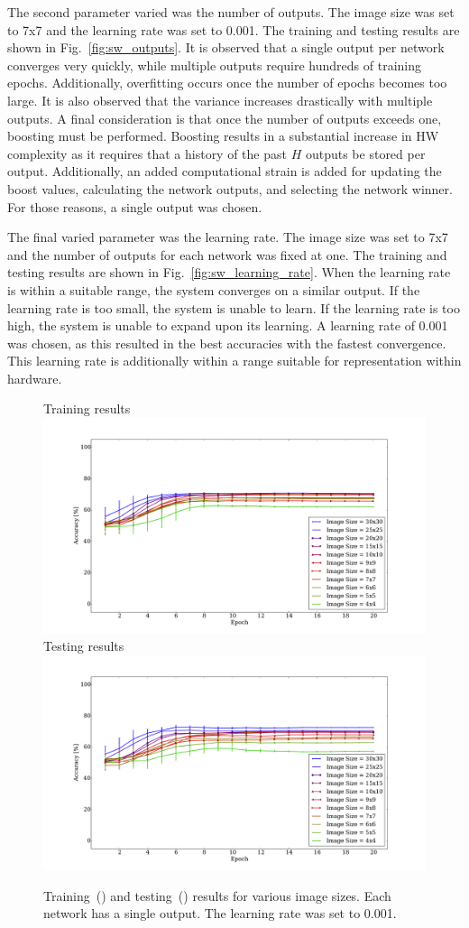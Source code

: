 \documentclass[10pt,journal]{IEEEtran}
\newcommand{\fig}[1]{Fig.~\ref{#1}}
\begin{document}
				The second parameter varied was the number of outputs. The image size was set to 7x7 and the learning rate was set to 0.001. The training and testing results are shown in \fig{fig:sw_outputs}. It is observed that a single output per network converges very quickly, while multiple outputs require hundreds of training epochs. Additionally, overfitting occurs once the number of epochs becomes too large. It is also observed that the variance increases drastically with multiple outputs. A final consideration is that once the number of outputs exceeds one, boosting must be performed. Boosting results in a substantial increase in HW complexity as it requires that a history of the past \(H\) outputs be stored per output. Additionally, an added computational strain is added for updating the boost values, calculating the network outputs, and selecting the network winner. For those reasons, a single output was chosen.
				
				The final varied parameter was the learning rate. The image size was set to 7x7 and the number of outputs for each network was fixed at one. The training and testing results are shown in \fig{fig:sw_learning_rate}. When the learning rate is within a suitable range, the system converges on a similar output. If the learning rate is too small, the system is unable to learn. If the learning rate is too high, the system is unable to expand upon its learning. A learning rate of 0.001 was chosen, as this resulted in the best accuracies with the fastest convergence. This learning rate is additionally within a range suitable for representation within hardware.
				
				\begin{figure}[t!]
					\captionsetup[subfigure]{position=b}
					\centering
					\hfill
					\subcaptionbox
					{
						Training results
						\label{fig:sw_img:training}
					}
					{\includegraphics[width=0.49\linewidth]{sw_img_training}}
					\hfill
					\subcaptionbox
					{
						Testing results
						\label{fig:sw_img:testing}
					}
					{\includegraphics[width=0.49\linewidth]{sw_img_testing}}
					\hfill
					\caption{Training~() and testing~() results for various image sizes. Each network has a single output. The learning rate was set to 0.001.}
					\label{fig:sw_img}
				\end{figure}
				
\end{document}
